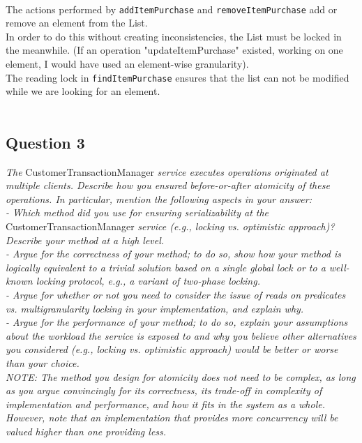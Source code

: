 \documentclass[paper=a4, fontsize=11pt]{scrartcl} %
\numberwithin{equation}{section} %
\numberwithin{figure}{section} %
\numberwithin{table}{section} %
\begin{document}
~\\
The actions performed by \verb|addItemPurchase| and \verb|removeItemPurchase| add or remove an element from the List. \\
In order to do this without creating inconsistencies, the List must be locked in the meanwhile. (If an operation "updateItemPurchase" existed, working on one element, I would have used an element-wise granularity).\\
The reading lock in \verb|findItemPurchase| ensures that the list can not be modified while we are looking for an element.\\
~\\
\clearpage

\subsection{Question 3}

\textit{The }CustomerTransactionManager\textit{ service executes
operations originated at multiple clients. Describe how you ensured before-or-after atomicity of these
operations. In particular, mention the following aspects in your answer:}\\
\textit{ - Which method did you use for ensuring serializability at the}
CustomerTransactionManager \textit{service (e.g., locking vs. optimistic approach)? Describe
your method at a high level.\\
 - Argue for the correctness of your method; to do so, show how your method is logically equivalent
to a trivial solution based on a single global lock or to a well-known locking protocol, e.g., a
variant of two-phase locking.\\
 - Argue for whether or not you need to consider the issue of reads on predicates vs. multigranularity
locking in your implementation, and explain why.\\
 - Argue for the performance of your method; to do so, explain your assumptions about the
workload the service is exposed to and why you believe other alternatives you considered (e.g.,
locking vs. optimistic approach) would be better or worse than your choice.\\
NOTE: The method you design for atomicity does not need to be complex, as long as you argue
convincingly for its correctness, its trade-off in complexity of implementation and performance, and how
it fits in the system as a whole. However, note that an implementation that provides more concurrency
will be valued higher than one providing less.\\}
~\\
\end{document}
